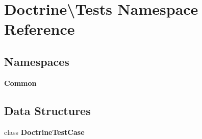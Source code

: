 \section{Doctrine\textbackslash{}Tests Namespace Reference}
\label{namespace_doctrine_1_1_tests}
\subsection*{Namespaces}
\begin{DoxyCompactItemize}
\item 
 {\bf Common}
\end{DoxyCompactItemize}
\subsection*{Data Structures}
\begin{DoxyCompactItemize}
\item 
class {\bf Doctrine\+Test\+Case}
\end{DoxyCompactItemize}
